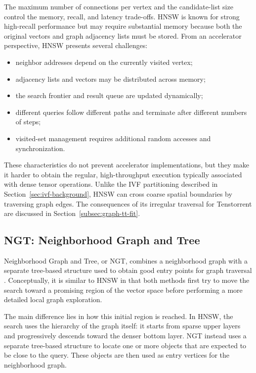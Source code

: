The maximum number of connections per vertex and the candidate-list size control the memory, recall, and latency trade-offs. HNSW is known for strong high-recall performance but may require substantial memory because both the original vectors and graph adjacency lists must be stored.
\newline
From an accelerator perspective, HNSW presents several challenges:
\begin{itemize}
\item neighbor addresses depend on the currently visited vertex;
\item adjacency lists and vectors may be distributed across memory;
\item the search frontier and result queue are updated dynamically;
\item different queries follow different paths and terminate after different numbers of steps;
\item visited-set management requires additional random accesses and synchronization.
\end{itemize}

These characteristics do not prevent accelerator implementations, but they make it harder to obtain the regular, high-throughput execution typically associated with dense tensor operations. Unlike the IVF partitioning described in Section~\ref{sec:ivf-background}, HNSW can cross coarse spatial boundaries by traversing graph edges. The consequences of its irregular traversal for Tenstorrent are discussed in Section~\ref{subsec:graph-tt-fit}.

\subsection{NGT: Neighborhood Graph and Tree}
\label{subsec:ngt}

Neighborhood Graph and Tree, or NGT, combines a neighborhood graph with a separate tree-based structure used to obtain good entry points for graph traversal \cite{ngt}. Conceptually, it is similar to HNSW in that both methods first try to move the search toward a promising region of the vector space before performing a more detailed local graph exploration.

The main difference lies in how this initial region is reached. In HNSW, the search uses the hierarchy of the graph itself: it starts from sparse upper layers and progressively descends toward the denser bottom layer. NGT instead uses a separate tree-based structure to locate one or more objects that are expected to be close to the query. These objects are then used as entry vertices for the neighborhood graph.

